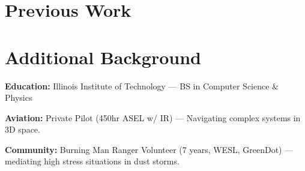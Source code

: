 \documentclass{resume}
\newcommand{\textapprox}{\raisebox{0.5ex}{\texttildelow}}
\begin{document}
\section{Previous Work}



\section{Additional Background}

\begin{compactitem}
\item \textbf{Education:} Illinois Institute of Technology --- BS in Computer Science \& Physics
\item \textbf{Aviation:} Private Pilot (\textapprox 450hr ASEL w/ IR) --- Navigating complex systems in 3D space.
\item \textbf{Community:} Burning Man Ranger Volunteer (7 years, WESL, GreenDot) --- mediating high stress situations in dust storms.
\end{compactitem}
\end{document}
